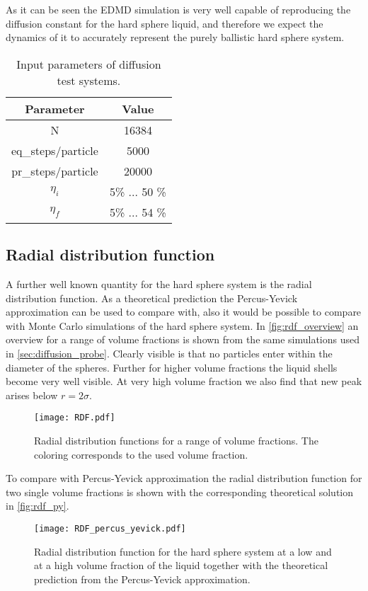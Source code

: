 As it can be seen the EDMD simulation is very well capable of reproducing the diffusion constant for the hard sphere liquid, and therefore we expect the dynamics of it to accurately represent the purely ballistic hard sphere system.\\


\begin{table}[h]
\centering
\begin{tabular}{c|c}
Parameter & Value \\ \hline
N & 16384 \\
eq\_steps/particle & 5000 \\
pr\_steps/particle & 20000 \\
$\eta_i$ & 5\% ... 50 \% \\
$\eta_f$ & 5\% ... 54 \% \\
\end{tabular}
\caption[Simulation parameters for diffusion measurement]{Input parameters of diffusion test systems.}
\label{tab:system_diffusion}
\end{table}





\subsection{Radial distribution function}
\label{sec:RDF_prob}
A further well known quantity for the hard sphere system is the radial distribution function. As a theoretical prediction the Percus-Yevick approximation can be used to compare with, also it would be possible to compare with Monte Carlo simulations of the hard sphere system. In \autoref{fig:rdf_overview} an overview for a range of volume fractions is shown from the same simulations used in \autoref{sec:diffusion_probe}. Clearly visible is that no particles enter within the diameter of the spheres. Further for higher volume fractions the liquid shells become very well visible. At very high volume fraction we also find that  new peak arises below $r = 2 \sigma$.
\begin{figure}[h]
\centering
\texttt{[image: RDF.pdf]}
\caption[Radial distribution functions at varying volume fractions]{Radial distribution functions for a range of volume fractions. The coloring corresponds to the used volume fraction.}
\label{fig:rdf_overview}
\end{figure}

To compare with Percus-Yevick approximation the radial distribution function for two single volume fractions is shown with the corresponding theoretical solution in \autoref{fig:rdf_py}.
\begin{figure}[h]
\centering
\texttt{[image: RDF\_percus\_yevick.pdf]}
\caption[Radial distribution function with Percus-Yevick solution]{Radial distribution function for the hard sphere system at a low and at a high volume fraction of the liquid together with the theoretical prediction from the Percus-Yevick approximation.}
\label{fig:rdf_py}
\end{figure}

